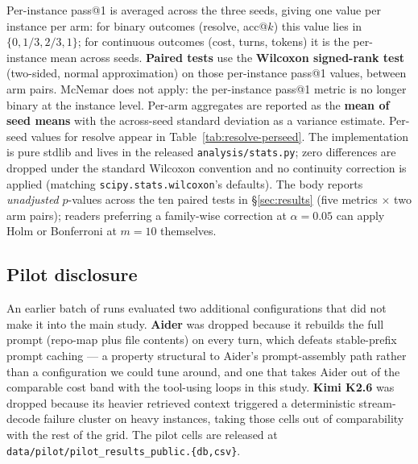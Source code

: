 Per-instance pass@1 is averaged across the three seeds, giving one value per instance per
arm: for binary outcomes (resolve, acc@$k$) this value lies in $\{0, 1/3, 2/3, 1\}$; for
continuous outcomes (cost, turns, tokens) it is the per-instance mean across seeds.
\textbf{Paired tests} use the \textbf{Wilcoxon signed-rank test} (two-sided, normal
approximation) on those per-instance pass@1 values, between arm pairs. McNemar does not
apply: the per-instance pass@1 metric is no longer binary at the instance level. Per-arm
aggregates are reported as the \textbf{mean of seed means} with the across-seed standard
deviation as a variance estimate. Per-seed values for resolve appear in
Table~\ref{tab:resolve-perseed}. The implementation is pure stdlib and lives in the
released \texttt{analysis/stats.py}; zero differences are dropped under the standard
Wilcoxon convention and no continuity correction is applied (matching
\texttt{scipy.stats.wilcoxon}'s defaults). The body reports \emph{unadjusted}
$p$-values across the ten paired tests in \S\ref{sec:results} (five metrics
$\times$ two arm pairs); readers preferring a family-wise correction at
$\alpha{=}0.05$ can apply Holm or Bonferroni at $m{=}10$ themselves.

\subsection{Pilot disclosure}
\label{sec:design-pilot}

An earlier batch of runs evaluated two additional configurations that did not make it
into the main study. \textbf{Aider} was dropped because it rebuilds the full prompt
(repo-map plus file contents) on every turn, which defeats stable-prefix prompt
caching --- a property structural to Aider's prompt-assembly path rather than a
configuration we could tune around, and one that takes Aider out of the comparable
cost band with the tool-using loops in this study. \textbf{Kimi K2.6} was dropped
because its heavier retrieved context triggered a deterministic stream-decode failure
cluster on heavy instances, taking those cells out of comparability with the rest of
the grid. The pilot cells are released at
\texttt{data/pilot/pilot\_results\_public.\{db,csv\}}.
